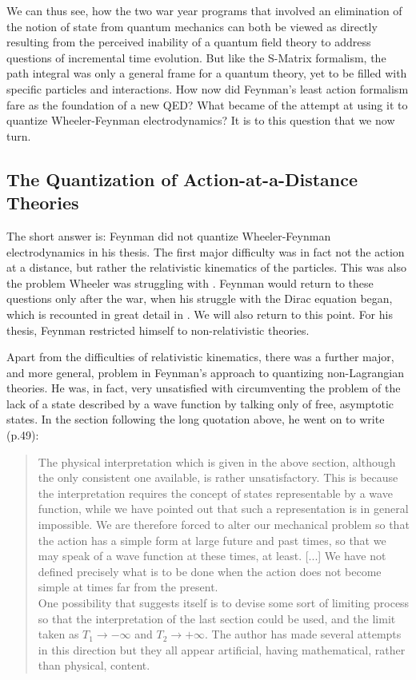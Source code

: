 \documentclass[12pt]{article}
\begin{document}
We can thus see, how the two war year programs that involved an elimination of the notion of state from quantum mechanics can both be viewed as directly resulting from the perceived inability of a quantum field theory to address questions of incremental time evolution. But like the S-Matrix formalism, the path integral was only a general frame for a quantum theory, yet to be filled with specific particles and interactions. How now did Feynman's least action formalism fare as the foundation of a new QED? What became of the attempt at using it to quantize Wheeler-Feynman electrodynamics? It is to this question that we now turn.

\subsection{The Quantization of Action-at-a-Distance Theories}

The short answer is: Feynman did not quantize Wheeler-Feynman electrodynamics in his thesis. The first major difficulty was in fact not the action at a distance, but rather the relativistic kinematics of the particles. This was also the problem Wheeler was struggling with \citep[130]{mehra_1994_the-beat}. Feynman would return to these questions only after the war, when his struggle with the Dirac equation began, which is recounted in great detail in \citep{wuethrich_2010_the-genesis}. We will also return to this point. For his thesis, Feynman restricted himself to non-relativistic theories.

Apart from the difficulties of relativistic kinematics, there was a further major, and more general, problem in Feynman's approach to quantizing non-Lagrangian theories. He was, in fact, very unsatisfied with circumventing the problem of the lack of a state described by a wave function by talking only of free, asymptotic states. In the section following the long quotation above, he went on to write (p.49):

\begin{quote}
The physical interpretation which is given in the above section, although the only consistent one available, is rather unsatisfactory. This is because the interpretation requires the concept of states representable by a wave function, while we have pointed out that such a representation is in general impossible. We are therefore forced to alter our mechanical problem so that the action has a simple form at large future and past times, so that we may speak of a wave function at these times, at least. [...] We have not defined precisely what is to be done when the action does not become simple at times far from the present.\\
One possibility that suggests itself is to devise some sort of limiting process so that the interpretation of the last section could be used, and the limit taken as $T_1 \rightarrow - \infty$ and $T_2 \rightarrow + \infty$. The author has made several attempts in this direction but they all appear artificial, having mathematical, rather than physical, content.
\end{quote}
\end{document}
